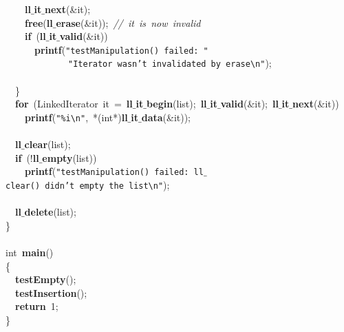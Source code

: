\documentclass{article}
\begin{document}
\mbox{}\ \ \ \ \textbf{ll$\_$it$\_$next}(\&it); \\
\mbox{}\ \ \ \ \textbf{free}(\textbf{ll$\_$erase}(\&it));\ \textit{//\ it\ is\ now\ invalid} \\
\mbox{}\ \ \ \ \textbf{if}\ (\textbf{ll$\_$it$\_$valid}(\&it)) \\
\mbox{}\ \ \ \ \ \ \textbf{printf}(\texttt{"{}testManipulation()\ failed:\ "{}} \\
\mbox{}\ \ \ \ \ \ \ \ \ \ \ \ \ \texttt{"{}Iterator\ wasn't\ invalidated\ by\ erase}\texttt{\textbackslash{}n}\texttt{"{}}); \\
\mbox{} \\
\mbox{}\ \ \} \\
\mbox{}\ \ \textbf{for}\ (LinkedIterator\ it\ =\ \textbf{ll$\_$it$\_$begin}(list);\ \textbf{ll$\_$it$\_$valid}(\&it);\ \textbf{ll$\_$it$\_$next}(\&it)) \\
\mbox{}\ \ \ \ \textbf{printf}(\texttt{"{}\%i}\texttt{\textbackslash{}n}\texttt{"{}},\ *(int*)\textbf{ll$\_$it$\_$data}(\&it)); \\
\mbox{} \\
\mbox{}\ \ \textbf{ll$\_$clear}(list); \\
\mbox{}\ \ \textbf{if}\ (!\textbf{ll$\_$empty}(list)) \\
\mbox{}\ \ \ \ \textbf{printf}(\texttt{"{}testManipulation()\ failed:\ ll$\_$clear()\ didn't\ empty\ the\ list}\texttt{\textbackslash{}n}\texttt{"{}}); \\
\mbox{} \\
\mbox{}\ \ \textbf{ll$\_$delete}(list); \\
\mbox{}\} \\
\mbox{} \\
\mbox{}int\ \textbf{main}() \\
\mbox{}\{ \\
\mbox{}\ \ \textbf{testEmpty}(); \\
\mbox{}\ \ \textbf{testInsertion}(); \\
\mbox{}\ \ \textbf{return}\ 1; \\
\mbox{}\} \\
\mbox{}
\end{document}
